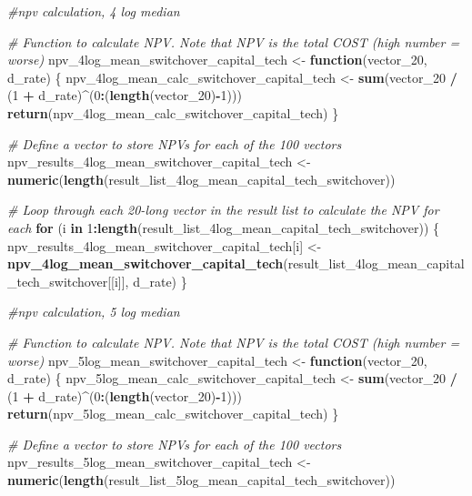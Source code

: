 \documentclass[
]{article}
\newenvironment{Shaded}{\begin{snugshade}}{\end{snugshade}}
\newcommand{\CommentTok}[1]{\textcolor[rgb]{0.56,0.35,0.01}{\textit{#1}}}
\newcommand{\ControlFlowTok}[1]{\textcolor[rgb]{0.13,0.29,0.53}{\textbf{#1}}}
\newcommand{\DecValTok}[1]{\textcolor[rgb]{0.00,0.00,0.81}{#1}}
\newcommand{\FunctionTok}[1]{\textcolor[rgb]{0.13,0.29,0.53}{\textbf{#1}}}
\newcommand{\NormalTok}[1]{#1}
\newcommand{\OtherTok}[1]{\textcolor[rgb]{0.56,0.35,0.01}{#1}}
\newcommand{\SpecialCharTok}[1]{\textcolor[rgb]{0.81,0.36,0.00}{\textbf{#1}}}
\begin{document}
\begin{Shaded}
\begin{Highlighting}[]
\CommentTok{\#npv calculation, 4 log median}


\CommentTok{\# Function to calculate NPV. Note that NPV is the total COST (high number = worse)}
\NormalTok{npv\_4log\_mean\_switchover\_capital\_tech }\OtherTok{\textless{}{-}} \ControlFlowTok{function}\NormalTok{(vector\_20, d\_rate) \{}
\NormalTok{  npv\_4log\_mean\_calc\_switchover\_capital\_tech }\OtherTok{\textless{}{-}} \FunctionTok{sum}\NormalTok{(vector\_20 }\SpecialCharTok{/}\NormalTok{ (}\DecValTok{1} \SpecialCharTok{+}\NormalTok{ d\_rate)}\SpecialCharTok{\^{}}\NormalTok{(}\DecValTok{0}\SpecialCharTok{:}\NormalTok{(}\FunctionTok{length}\NormalTok{(vector\_20)}\SpecialCharTok{{-}}\DecValTok{1}\NormalTok{)))}
  \FunctionTok{return}\NormalTok{(npv\_4log\_mean\_calc\_switchover\_capital\_tech)}
\NormalTok{\}}

\CommentTok{\# Define a vector to store NPVs for each of the 100 vectors}
\NormalTok{npv\_results\_4log\_mean\_switchover\_capital\_tech }\OtherTok{\textless{}{-}} \FunctionTok{numeric}\NormalTok{(}\FunctionTok{length}\NormalTok{(result\_list\_4log\_mean\_capital\_tech\_switchover))}

\CommentTok{\# Loop through each 20{-}long vector in the result list to calculate the NPV for each}
\ControlFlowTok{for}\NormalTok{ (i }\ControlFlowTok{in} \DecValTok{1}\SpecialCharTok{:}\FunctionTok{length}\NormalTok{(result\_list\_4log\_mean\_capital\_tech\_switchover)) \{}
\NormalTok{  npv\_results\_4log\_mean\_switchover\_capital\_tech[i] }\OtherTok{\textless{}{-}} \FunctionTok{npv\_4log\_mean\_switchover\_capital\_tech}\NormalTok{(result\_list\_4log\_mean\_capital\_tech\_switchover[[i]], d\_rate)}
\NormalTok{\}}


\CommentTok{\#npv calculation, 5 log median}


\CommentTok{\# Function to calculate NPV. Note that NPV is the total COST (high number = worse)}
\NormalTok{npv\_5log\_mean\_switchover\_capital\_tech }\OtherTok{\textless{}{-}} \ControlFlowTok{function}\NormalTok{(vector\_20, d\_rate) \{}
\NormalTok{  npv\_5log\_mean\_calc\_switchover\_capital\_tech }\OtherTok{\textless{}{-}} \FunctionTok{sum}\NormalTok{(vector\_20 }\SpecialCharTok{/}\NormalTok{ (}\DecValTok{1} \SpecialCharTok{+}\NormalTok{ d\_rate)}\SpecialCharTok{\^{}}\NormalTok{(}\DecValTok{0}\SpecialCharTok{:}\NormalTok{(}\FunctionTok{length}\NormalTok{(vector\_20)}\SpecialCharTok{{-}}\DecValTok{1}\NormalTok{)))}
  \FunctionTok{return}\NormalTok{(npv\_5log\_mean\_calc\_switchover\_capital\_tech)}
\NormalTok{\}}

\CommentTok{\# Define a vector to store NPVs for each of the 100 vectors}
\NormalTok{npv\_results\_5log\_mean\_switchover\_capital\_tech }\OtherTok{\textless{}{-}} \FunctionTok{numeric}\NormalTok{(}\FunctionTok{length}\NormalTok{(result\_list\_5log\_mean\_capital\_tech\_switchover))}


\end{Highlighting}
\end{Shaded}
\end{document}
